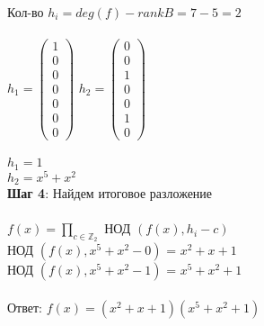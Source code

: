 \documentclass[12pt]{article}
\begin{document}
 Кол-во $h_i = deg(f) - rank B = 7 - 5 = 2$\\\\
$h_1= \begin{pmatrix}
                      1 \\
                      0 \\
                      0 \\
                      0 \\
                      0 \\
                      0 \\
                      0
                  \end{pmatrix}$
$h_2= \begin{pmatrix}
                      0 \\
                      0 \\
                      1 \\
                      0 \\
                      0 \\
                      1 \\
                      0
                  \end{pmatrix}$\\\\
$h_1 = 1$\\
$h_2 = x^5 + x^2$\\
\textbf{Шаг 4}: Найдем итоговое разложение\\\\
$f(x) = \underset{c \in \mathbb{Z}_2}{\prod}$ НОД $(f(x), h_i - c)$\\
НОД $(f(x), x^5 + x^2 - 0)$ = $x^2 + x + 1$\\
НОД $(f(x), x^5 + x^2 - 1)$ = $x^5 + x^2 + 1$\\\\
Ответ: $f(x) = (x^2 + x + 1)(x^5 + x^2 + 1)$
\end{document}
